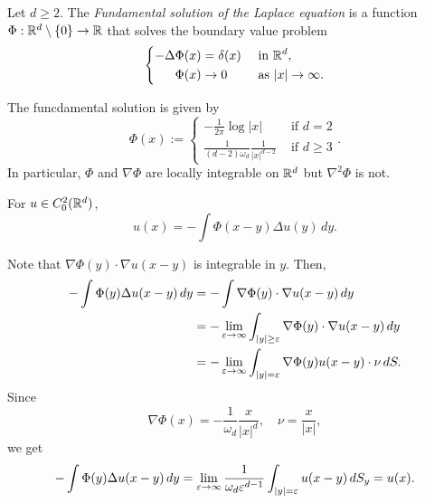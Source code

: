 \documentclass{../../large}
\begin{document}
\begin{prb}
Let $d\ge2$.
The \emph{Fundamental solution of the Laplace equation} is a function $\Phi:\mathbb{R}^d\setminus\{0\}\to\mathbb{R}$ that solves the boundary value problem
\[\left\{\begin{alignedat}{2}
-\Delta\Phi(x)&=\delta(x) &\quad&\text{ in }\mathbb{R}^d,\\
\Phi(x)&\to0 &&\text{ as }|x|\to\infty.
\end{alignedat}\right.\]
\begin{parts}
\item The funcdamental solution is given by
\[\Phi(x):=\begin{cases}-\frac1{2\pi}\log|x|&\text{ if }d=2\\\frac1{(d-2)\omega_d}\frac1{|x|^{d-2}}&\text{ if }d\ge3\end{cases}.\]
In particular, $\Phi$ and $\nabla\Phi$ are locally integrable on $\mathbb{R}^d$ but $\nabla^2\Phi$ is not.
\item For $u\in C_0^2(\mathbb{R}^d)$,
\[u(x)=-\int\Phi(x-y)\Delta u(y)\,dy.\]
\end{parts}
\end{prb}
\begin{pf}
Note that $\nabla\Phi(y)\cdot\nabla u(x-y)$ is integrable in $y$.
Then,
\begin{align*}
-\int\Phi(y)\Delta u(x-y)\,dy
&=-\int\nabla\Phi(y)\cdot\nabla u(x-y)\,dy\\
&=-\lim_{\varepsilon\to\infty}\int_{|y|\ge\varepsilon}\nabla\Phi(y)\cdot\nabla u(x-y)\,dy\\
&=-\lim_{\varepsilon\to\infty}\int_{|y|=\varepsilon}\nabla\Phi(y)u(x-y)\cdot\nu\,dS.
\end{align*}
Since
\[\nabla\Phi(x)=-\frac1{\omega_d}\frac x{|x|^d},\quad\nu=\frac x{|x|},\]
we get
\[-\int\Phi(y)\Delta u(x-y)\,dy=\lim_{\varepsilon\to\infty}\frac1{\omega_d\varepsilon^{d-1}}\int_{|y|=\varepsilon}u(x-y)\,dS_y=u(x).\]

\end{pf}
\end{document}
